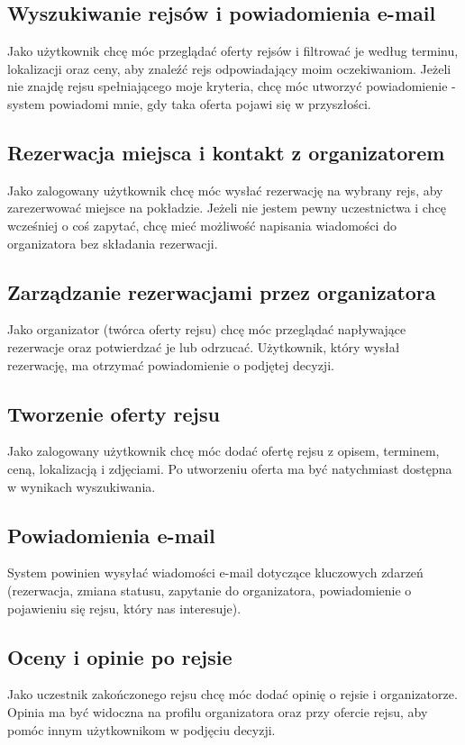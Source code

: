\documentclass[shortabstract]{iithesis}
\begin{document}
\subsection{Wyszukiwanie rejsów i powiadomienia e-mail}
Jako użytkownik chcę móc przeglądać oferty rejsów i filtrować je według terminu, lokalizacji oraz ceny, aby znaleźć rejs odpowiadający moim oczekiwaniom. Jeżeli nie znajdę rejsu spełniającego moje kryteria, chcę móc utworzyć powiadomienie - system powiadomi mnie, gdy taka oferta pojawi się w przyszłości.

\subsection{Rezerwacja miejsca i kontakt z organizatorem}
Jako zalogowany użytkownik chcę móc wysłać rezerwację na wybrany rejs, aby zarezerwować miejsce na pokładzie. Jeżeli nie jestem pewny uczestnictwa i chcę wcześniej o coś zapytać, chcę mieć możliwość napisania wiadomości do organizatora bez składania rezerwacji.

\subsection{Zarządzanie rezerwacjami przez organizatora}
Jako organizator (twórca oferty rejsu) chcę móc przeglądać napływające rezerwacje oraz potwierdzać je lub odrzucać. Użytkownik, który wysłał rezerwację, ma otrzymać powiadomienie o podjętej decyzji.

\subsection{Tworzenie oferty rejsu}
Jako zalogowany użytkownik chcę móc dodać ofertę rejsu z opisem, terminem, ceną, lokalizacją i zdjęciami. Po utworzeniu oferta ma być natychmiast dostępna w wynikach wyszukiwania.

\subsection{Powiadomienia e-mail}
System powinien wysyłać wiadomości e-mail dotyczące kluczowych zdarzeń (rezerwacja, zmiana statusu, zapytanie do organizatora, powiadomienie o pojawieniu się rejsu, który nas interesuje).

\subsection{Oceny i opinie po rejsie}
Jako uczestnik zakończonego rejsu chcę móc dodać opinię o rejsie i organizatorze. Opinia ma być widoczna na profilu organizatora oraz przy ofercie rejsu, aby pomóc innym użytkownikom w podjęciu decyzji.
\end{document}

